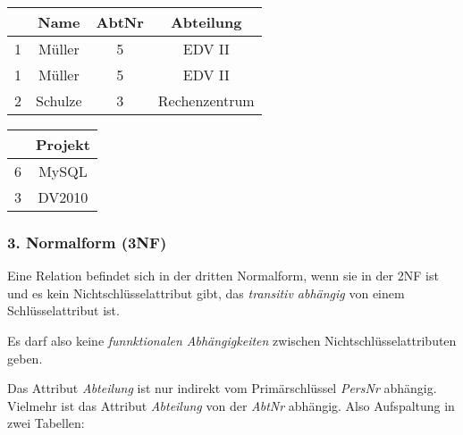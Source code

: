 \documentclass[9pt,a4paper]{arbeitsblatt}
\begin{document}
\begin{multicols}{2}
	\begin{center}
		\begin{tabular}{|c|c|c|c|}\hline
			\rowcolor{ab.tabelle.kopf.hg}
			\primarykey{PersNr} & Name    & AbtNr & Abteilung     \\\hline
			1                   & Müller  & 5     & EDV II        \\\hline
			1                   & Müller  & 5     & EDV II        \\\hline
			2                   & Schulze & 3     & Rechenzentrum \\\hline
		\end{tabular}
	\end{center}

	\begin{center}
		\begin{tabular}{|c|c|}\hline
			\rowcolor{ab.tabelle.kopf.hg}
			\primarykey{ProjNr} & Projekt \\\hline
			6                   & MySQL   \\\hline
			3                   & DV2010  \\\hline
		\end{tabular}
	\end{center}
\end{multicols}

\newpage

\begin{infobox}\vspace*{-1em}
	\subsubsection*{3. Normalform (3NF)}

	Eine Relation befindet sich in der dritten Normalform, wenn sie in der 2NF ist
	und es kein Nichtschlüsselattribut gibt, das \emph{transitiv abhängig} von einem
	Schlüsselattribut ist.

	Es darf also keine \emph{funnktionalen Abhängigkeiten} zwischen Nichtschlüsselattributen
	geben.
\end{infobox}

Das Attribut \emph{Abteilung} ist nur indirekt vom Primärschlüssel
\emph{PersNr} abhängig. Vielmehr ist das Attribut
\emph{Abteilung} von der \emph{AbtNr} abhängig. Also
Aufspaltung in zwei Tabellen:
\end{document}
